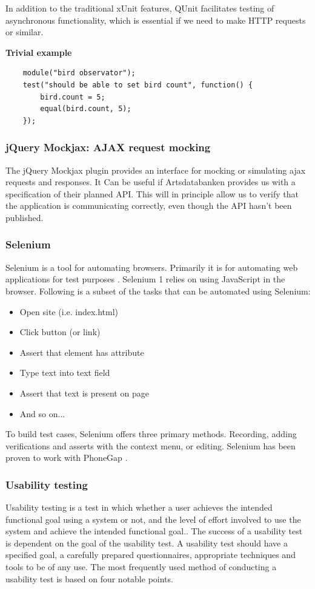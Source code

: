 	In addition to the traditional xUnit features, QUnit facilitates testing of
	asynchronous functionality, which is essential if we need to make HTTP
	requests or similar.

	\textbf{Trivial example}

\begin{lstlisting}
	module("bird observator");
	test("should be able to set bird count", function() {
		bird.count = 5;
		equal(bird.count, 5);
	});
\end{lstlisting}

\subsubsection{jQuery Mockjax: AJAX request mocking}

	The jQuery Mockjax plugin provides an interface for mocking or simulating
	ajax requests and responses. \cite{github:jquery-mockjax}It Can be useful if Artsdatabanken provides us
	with a specification of their planned API. This will in principle allow us
	to verify that the application is communicating correctly, even though the
	API hasn't been published.

\subsubsection{Selenium}

	Selenium is a tool for automating browsers. Primarily it is for automating
	web applications for test purposes \cite{seleniumhq:home}. Selenium 1 relies
	on using JavaScript in the browser. Following is a subset of the tasks that
	can be automated using Selenium:

	\begin{itemize}
		\item Open site (i.e. index.html)
		\item Click button (or link)
		\item Assert that element has attribute
		\item Type text into text field
		\item Assert that text is present on page
		\item And so on...
	\end{itemize}

	To build test cases, Selenium offers three primary methods. Recording, adding
	verifications and asserts with the context menu, or editing. Selenium has
	been proven to work with PhoneGap \cite{phonegap:automatic-test-cases}.
\subsubsection{Usability testing}
Usability testing is a test in which whether a user achieves the intended functional goal using a system or not, and the level of effort involved to use the system and achieve the intended functional goal.\cite{iso:9126}. The success of a usability test is dependent on the goal of the usability test. A usability test should have a specified goal, a carefully prepared questionnaires, appropriate techniques and tools to be of any use. The most frequently used method of conducting a usability test is based on four notable points\cite{usability:doc2}\cite{usability:doc3}.

